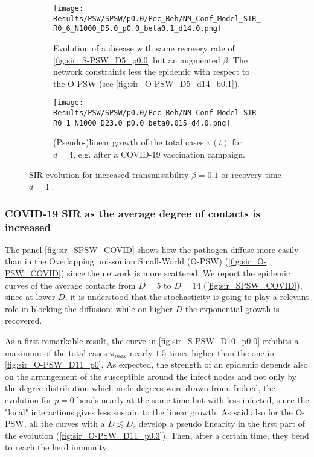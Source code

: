 \documentclass[a4paper,10pt,twoside]{book} %
\theoremstyle{definition}
\begin{document}
\clearpage
\begin{figure}[H]
	\centering
	\begin{subfigure}{0.8\linewidth}
		\texttt{[image: Results/PSW/SPSW/p0.0/Pec\_Beh/NN\_Conf\_Model\_SIR\_R0\_6\_N1000\_D5.0\_p0.0\_beta0.1\_d14.0.png]}
		\caption{Evolution of a disease with same recovery rate of \autoref{fig:sir_S-PSW_D5_p0.0} but an augmented $\beta$. The network constraints less the epidemic with respect to the O-PSW (see \autoref{fig:sir_O-PSW_D5_d14_b0.1}).}
		\label{fig:SPSW_b0.015_d14}
	\end{subfigure}
	\par\medskip
	\begin{subfigure}{0.8\linewidth}
		\texttt{[image: Results/PSW/SPSW/p0.0/Pec\_Beh/NN\_Conf\_Model\_SIR\_R0\_1\_N1000\_D23.0\_p0.0\_beta0.015\_d4.0.png]}
		\caption{(Pseudo-)linear growth of the total cases $\pi(t)$ for $d = 4$, e.g. after a COVID-19 vaccination campaign.}
		\label{fig:sir_SPSW_D23_beta0.015_d4}
	\end{subfigure}
	\caption{SIR evolution for increased transmissibility $ \beta = 0.1$ or recovery time $ d = 4$ .}
\end{figure}

\clearpage
\subsubsection{COVID-19 SIR as the average degree of contacts is increased}
The panel \autoref{fig:sir_SPSW_COVID} shows how the pathogen diffuse more easily than in the Overlapping poissonian Small-World (O-PSW) (\autoref{fig:sir_O-PSW_COVID}) since the network is more scattered. We report the epidemic curves of the average contacts from $D = 5$ to $D = 14$ (\autoref{fig:sir_SPSW_COVID}), since at lower $D$, it is understood that the stochasticity is going to play a relevant role in blocking the diffusion; while on higher $D$ the exponential growth is recovered.

As a first remarkable result, the curve in \autoref{fig:sir_S-PSW_D10_p0.0} exhibits a maximum of the total cases $ \pi_{max}$ nearly $1.5$ times higher than the one in \autoref{fig:sir_O-PSW_D11_p0}. As expected, the strength of an epidemic depends also on the arrangement of the susceptible around the infect nodes and not only by the degree distribution which node degrees were drawn from. Indeed, the evolution for $ p = 0$  bends nearly at the same time but with less infected, since the "local" interactions gives less sustain to the linear growth. As said also for the O-PSW, all the curves with a $D \lesssim D_c$ develop a pseudo linearity in the first part of the evolution (\autoref{fig:sir_O-PSW_D11_p0.3}). Then, after a certain time, they bend to reach the herd immunity.
\end{document}
